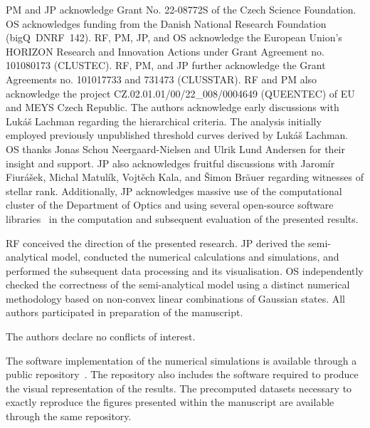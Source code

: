 \documentclass{optica-article}
\begin{document}
%

\FloatBarrier
\begin{backmatter}

PM and JP acknowledge Grant No. 22-08772S of the Czech Science Foundation.
OS acknowledges funding from the Danish National Research Foundation (bigQ~DNRF~142).
RF, PM, JP, and OS acknowledge the European Union's HORIZON Research and Innovation Actions under Grant Agreement no. 101080173 (CLUSTEC).
RF, PM, and JP further acknowledge the Grant Agreements no. 101017733 and 731473 (CLUSSTAR).
RF and PM also acknowledge the project \mbox{CZ.02.01.01/00/22\_008/0004649} (QUEENTEC) of EU and MEYS Czech Republic. 
%
The authors acknowledge early discussions with Luk\'{a}\v{s} Lachman regarding the hierarchical criteria. The analysis initially employed previously unpublished threshold curves derived by Luk\'{a}\v{s} Lachman. 
%
OS thanks Jonas Schou Neergaard-Nielsen and Ulrik Lund Andersen for their insight and support. 
%
JP also acknowledges fruitful discussions with Jarom\'{i}r Fiur\'{a}\v{s}ek, Michal Matul\'{i}k, Vojt\v{e}ch Kala, and \v{S}imon Br\"{a}uer regarding witnesses of stellar rank. 
%
Additionally, JP acknowledges massive use of the computational cluster of the Department of Optics and using several open-source software libraries~\cite{hunter2007,harris2020,virtanen2020,dalcin2021} in the computation and subsequent evaluation of the presented results.

RF conceived the direction of the presented research. JP derived the semi-analytical model, conducted the numerical calculations and simulations, and performed the subsequent data processing and its visualisation. OS independently checked the correctness of the semi-analytical model using a distinct numerical methodology based on non-convex linear combinations of Gaussian states. All authors participated in preparation of the manuscript.


The authors declare no conflicts of interest.

The software implementation of the numerical simulations is available through a public repository~\cite{source}. The repository also includes the software required to produce the visual representation of the results. The precomputed datasets necessary to exactly reproduce the figures presented within the manuscript are available through the same repository.

\end{backmatter}

%


\end{document}
